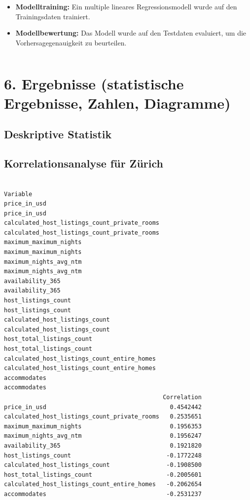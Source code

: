 \documentclass[
  journal,
]{IEEEtran}%
\begin{document}
\begin{itemize}
\item
  \textbf{Modelltraining:} Ein multiple lineares Regressionsmodell wurde
  auf den Trainingsdaten trainiert.
\item
  \textbf{Modellbewertung:} Das Modell wurde auf den Testdaten
  evaluiert, um die Vorhersagegenauigkeit zu beurteilen.
\end{itemize}

\begin{verbatim}
\end{verbatim}

\section{6. Ergebnisse (statistische Ergebnisse, Zahlen,
Diagramme)}\label{ergebnisse-statistische-ergebnisse-zahlen-diagramme}

\subsection{\texorpdfstring{\textbf{Deskriptive
Statistik}}{Deskriptive Statistik}}\label{deskriptive-statistik-1}

\subsection{\texorpdfstring{\textbf{Korrelationsanalyse für
Zürich}}{Korrelationsanalyse für Zürich}}\label{korrelationsanalyse-fuxfcr-zuxfcrich}

\begin{verbatim}
                                                                                 Variable
price_in_usd                                                                 price_in_usd
calculated_host_listings_count_private_rooms calculated_host_listings_count_private_rooms
maximum_maximum_nights                                             maximum_maximum_nights
maximum_nights_avg_ntm                                             maximum_nights_avg_ntm
availability_365                                                         availability_365
host_listings_count                                                   host_listings_count
calculated_host_listings_count                             calculated_host_listings_count
host_total_listings_count                                       host_total_listings_count
calculated_host_listings_count_entire_homes   calculated_host_listings_count_entire_homes
accommodates                                                                 accommodates
                                             Correlation
price_in_usd                                   0.4542442
calculated_host_listings_count_private_rooms   0.2535651
maximum_maximum_nights                         0.1956353
maximum_nights_avg_ntm                         0.1956247
availability_365                               0.1921820
host_listings_count                           -0.1772248
calculated_host_listings_count                -0.1908500
host_total_listings_count                     -0.2005601
calculated_host_listings_count_entire_homes   -0.2062654
accommodates                                  -0.2531237
\end{verbatim}
\end{document}
